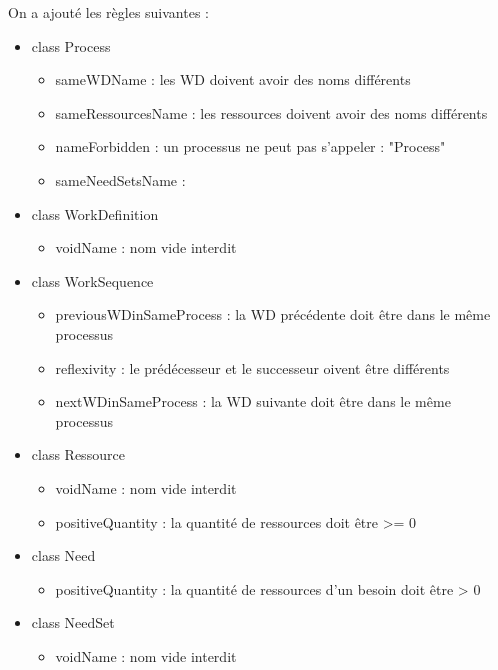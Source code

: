 On a ajouté les règles suivantes :
\begin{itemize}
\item class Process
\begin{itemize}
\item sameWDName : les WD doivent avoir des noms différents
\item sameRessourcesName : les ressources doivent avoir des noms différents
\item nameForbidden : un processus ne peut pas s'appeler : "Process"
\item sameNeedSetsName :
\end{itemize}

\item class WorkDefinition
\begin{itemize}
\item voidName : nom vide interdit
\end{itemize}

\item class WorkSequence
\begin{itemize}
\item previousWDinSameProcess : la WD précédente doit être dans le même processus
\item reflexivity : le prédécesseur et le successeur oivent être différents
\item nextWDinSameProcess : la WD suivante doit être dans le même processus
\end{itemize}

\item class Ressource
\begin{itemize}
\item voidName : nom vide interdit
\item positiveQuantity : la quantité de ressources doit être >= 0
\end{itemize}

\item class Need
\begin{itemize}
\item positiveQuantity : la quantité de ressources d'un besoin doit être > 0
\end{itemize}

\item class NeedSet
\begin{itemize}
\item voidName : nom vide interdit
\end{itemize}
\end{itemize}
